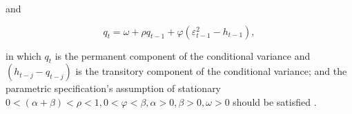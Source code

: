 and

\begin{equation}
q_{t} = \omega + \rho q_{t-1}  +\varphi(\varepsilon_{t-1}^{2}-h_{t-1}),
\end{equation}

in which $q_{t}$ is the permanent component of the conditional variance and $(h_{t-j} - q_{t-j})$  is the transitory component of the conditional variance; and the parametric specification’s assumption of stationary $0<(\alpha + \beta) < \rho <1, 0<\varphi<\beta, \alpha >0, \beta>0, \omega >0 $ should be satisfied \citep{0-19-829683-5,Ghalanos2014}.


%
%
%  
%
